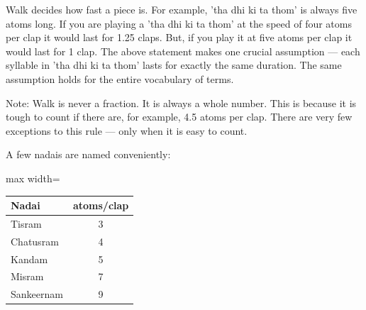 Walk decides how fast a piece is. For example, 'tha dhi ki ta thom' is always five
atoms long. If you are playing a 'tha dhi ki ta thom' at the speed of four atoms per
clap it would last for 1.25 claps. But, if you play it at five atoms per clap it
would last for 1 clap. The above statement makes one crucial assumption --- each
syllable in 'tha dhi ki ta thom' lasts for exactly the same duration. The same
assumption holds for the entire vocabulary of terms.

Note: Walk is never a fraction. It is always a whole number. This is because it is
tough to count if there are, for example, 4.5 atoms per clap. There are very few
exceptions to this rule --- only when it is easy to count.

A few nadais are named conveniently:

\begin{center}
\begin{adjustbox}{max width=\textwidth}
\begin{tabular}{l c}
\toprule
Nadai & atoms/clap\\
\midrule
Tisram     & 3\\
Chatusram  & 4\\
Kandam     & 5\\
Misram     & 7\\
Sankeernam & 9\\
\bottomrule
\end{tabular}
\end{adjustbox}
\end{center}
